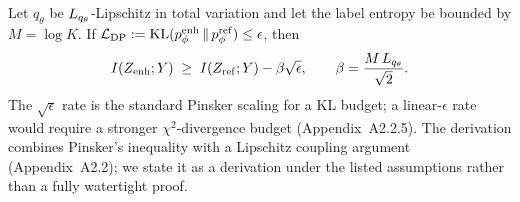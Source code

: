 
\begin{lemma}\label{lem:dp}
Let $q_\theta$ be $L_{q_\theta}$-Lipschitz in total variation and let the label entropy be
bounded by $M=\log K$. If $\mathcal{L}_{\mathrm{DP}} := \operatorname{KL}(p_\phi^{\mathrm{enh}} \,\|\, p_\phi^{\mathrm{ref}}) \leq \epsilon$, then
\begin{equation}
I(Z_{\mathrm{enh}}; Y) \;\geq\; I(Z_{\mathrm{ref}}; Y) - \beta\sqrt{\epsilon},
\qquad \beta = \frac{M\,L_{q_\theta}}{\sqrt{2}}.
\label{eq:lemma3}
\end{equation}
The $\sqrt{\epsilon}$ rate is the standard Pinsker scaling for a KL budget; a linear-$\epsilon$
rate would require a stronger $\chi^2$-divergence budget (Appendix~A2.2.5). The derivation
combines Pinsker's inequality with a Lipschitz coupling argument (Appendix~A2.2); we state it
as a derivation under the listed assumptions rather than a fully watertight proof.
\end{lemma}
